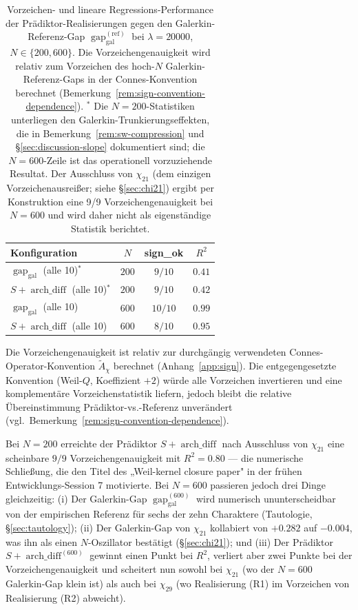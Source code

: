 \documentclass[10pt,twocolumn]{article}
\theoremstyle{definition}
\theoremstyle{remark}
\newcommand{\gap}{\operatorname{gap}}
\newcommand{\chifn}{\chi}
\newcommand{\archdiff}{\operatorname{arch\_diff}}
\begin{document}
\begin{table}[t]
\caption{Vorzeichen- und lineare Regressions-Performance der
  Prädiktor-Realisierungen gegen den Galerkin-Referenz-Gap
  $\gap_{\mathrm{gal}}^{(\mathrm{ref})}$ bei $\lambda=20000$,
  $N\in\{200,600\}$. Die Vorzeichengenauigkeit wird relativ zum
  Vorzeichen des hoch-$N$ Galerkin-Referenz-Gaps in der
  Connes-Konvention berechnet (Bemerkung~\ref{rem:sign-convention-dependence}).
  $^*$ Die $N=200$-Statistiken unterliegen den
  Galerkin-Trunkierungseffekten, die in
  Bemerkung~\ref{rem:sw-compression} und
  \S\ref{sec:discussion-slope} dokumentiert sind; die $N=600$-Zeile ist
  das operationell vorzuziehende Resultat.
  Der Ausschluss von $\chifn_{21}$ (dem einzigen Vorzeichenausreißer;
  siehe \S\ref{sec:chi21}) ergibt per Konstruktion eine 9/9
  Vorzeichengenauigkeit bei $N=600$ und wird daher nicht als
  eigenständige Statistik berichtet.}
\label{tab:regression}
\centering
\small
\begin{tabular}{@{}lccc@{}}
\toprule
Konfiguration & $N$ & sign\_ok & $R^2$ \\
\midrule
$\gap_{\mathrm{gal}}$ (alle 10)$^*$ & $200$ & $9/10$ & $0.41$ \\
$S+\archdiff$ (alle 10)$^*$ & $200$ & $9/10$ & $0.42$ \\
\midrule
$\gap_{\mathrm{gal}}$ (alle 10) & $600$ & $10/10$ & $0.99$ \\
$S+\archdiff$ (alle 10) & $600$ & $8/10$ & $0.95$ \\
\bottomrule
\end{tabular}

\smallskip
\footnotesize
Die Vorzeichengenauigkeit ist relativ zur durchgängig verwendeten
Connes-Operator-Konvention $\tilde{A}_\chi$ berechnet
(Anhang~\ref{app:sign}). Die entgegengesetzte Konvention
(Weil-$Q$, Koeffizient $+2$) würde alle Vorzeichen invertieren und
eine komplementäre Vorzeichenstatistik liefern, jedoch bleibt die
relative Übereinstimmung Prädiktor-vs.-Referenz unverändert
(vgl.\ Bemerkung~\ref{rem:sign-convention-dependence}).
\end{table}

Bei $N=200$ erreichte der Prädiktor $S+\archdiff$ nach Ausschluss von
$\chifn_{21}$ eine scheinbare $9/9$ Vorzeichengenauigkeit mit $R^2=0.80$
--- die numerische Schließung, die den Titel des „Weil-kernel closure
paper" in der frühen Entwicklungs-Session 7 motivierte. Bei $N=600$
passieren jedoch drei Dinge gleichzeitig:
(i) Der Galerkin-Gap $\gap_{\mathrm{gal}}^{(600)}$ wird
numerisch ununterscheidbar von der empirischen Referenz für sechs
der zehn Charaktere (Tautologie, \S\ref{sec:tautology});
(ii) Der Galerkin-Gap von $\chifn_{21}$ kollabiert von $+0.282$ auf
$-0.004$, was ihn als einen $N$-Oszillator bestätigt
(\S\ref{sec:chi21}); und
(iii) Der Prädiktor $S+\archdiff^{(600)}$ gewinnt einen Punkt bei
$R^2$, verliert aber zwei Punkte bei der Vorzeichengenauigkeit und scheitert nun
sowohl bei $\chifn_{21}$ (wo der $N=600$ Galerkin-Gap klein ist) als auch bei
$\chifn_{29}$ (wo Realisierung (R1) im Vorzeichen von
Realisierung (R2) abweicht).
\end{document}
